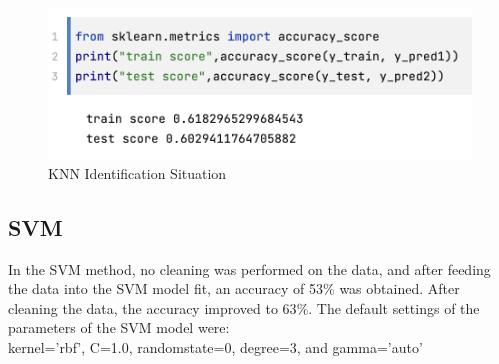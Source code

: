 \documentclass[conference]{IEEEtran}
\begin{document}
{	\begin{figure}[h]
	\label{fig:foo}
	\begin{center}
	\includegraphics[scale=0.36]{KNNResult.png}
	\caption{KNN Identification Situation}
	\end{center}
	\end{figure}

\subsection{SVM}
In the SVM method, no cleaning was performed on the data, and after feeding the data into the SVM model fit, an accuracy of 53$\%$ was obtained. After cleaning the data, the accuracy improved to 63$\%$. The default settings of the parameters of the SVM model were:\\

kernel='rbf', C=1.0, randomstate=0, degree=3, and gamma='auto' \\

}
\end{document}
